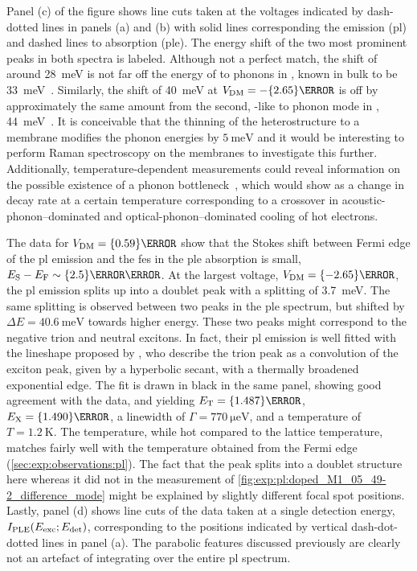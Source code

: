Panel (c) of the figure shows line cuts taken at the voltages indicated by dash-dotted lines in panels (a) and (b) with solid lines corresponding the emission (\gls{pl}) and dashed lines to absorption (\gls{ple}).
The energy shift of the two most prominent peaks in both spectra is labeled.
Although not a perfect match, the shift of around \qty{28}{\milli\electronvolt} is not far off the energy of \acrshort{to} phonons in , known in bulk to be \qty{33}{\milli\electronvolt}~\cite{Strauch1990}.
Similarly, the shift of \qty{40}{\milli\electronvolt} at $\VDM=-\qty{2.65}{\volt}$ is off by approximately the same amount from the second, -like \acrshort{to} phonon mode in , \qty{44}{\milli\electronvolt}~\cite{Ilegems1970,Leng1989,Gammon1991}.
It is conceivable that the thinning of the heterostructure to a membrane modifies the phonon energies by $\qty{5}{\milli\electronvolt}$ and it would be interesting to perform Raman spectroscopy on the membranes to investigate this further.
Additionally, temperature-dependent measurements could reveal information on the possible existence of a phonon bottleneck~\cite{Murdin1997}, which would show as a change in decay rate at a certain temperature corresponding to a crossover in acoustic-phonon--dominated and optical-phonon--dominated cooling of hot electrons.

The data for $\VDM = \qty{0.59}{\volt}$ show that the Stokes shift between Fermi edge of the \gls{pl} emission and the \gls{fes} in the \gls{ple} absorption is small, $E_{\mr{S}} - E_{\mr{F}}\sim\qty{2.5}{\milli\electronvolt}$.
At the largest voltage, $\VDM = \qty{-2.65}{\volt}$, the \gls{pl} emission splits up into a doublet peak with a splitting of \qty{3.7}{\milli\electronvolt}.
The same splitting is observed between two peaks in the \gls{ple} spectrum, but shifted by $\Delta E = \qty{40.6}{\milli\electronvolt}$ towards higher energy.
These two peaks might correspond to the negative trion and neutral excitons.
In fact, their \gls{pl} emission is well fitted with the lineshape proposed by \citet{Esser2001}, who describe the trion peak as a convolution of the exciton peak, given by a hyperbolic secant, with a thermally broadened exponential edge.
The fit is drawn in black in the same panel, showing good agreement with the data, and yielding $E_{\mr{T}} = \qty{1.487}{\electronvolt}$, $E_{\mr{X}} = \qty{1.490}{\electronvolt}$, a linewidth of $\Gamma = \qty{770}{\micro\electronvolt}$, and a temperature of $T = \qty{1.2}{\kelvin}$.
The temperature, while hot compared to the lattice temperature, matches fairly well with the temperature obtained from the Fermi edge (\cref{sec:exp:observations:pl}).
The fact that the peak splits into a doublet structure here whereas it did not in the measurement of \cref{fig:exp:pl:doped_M1_05_49-2_difference_mode} might be explained by slightly different focal spot positions.
Lastly, panel (d) shows line cuts of the data taken at a single detection energy, $I_{\mathrm{PLE}}(E_{\mathrm{exc}}; E_{\mathrm{det}})$, corresponding to the positions indicated by vertical dash-dot-dotted lines in panel (a).
The parabolic features discussed previously are clearly not an artefact of integrating over the entire \gls{pl} spectrum.

